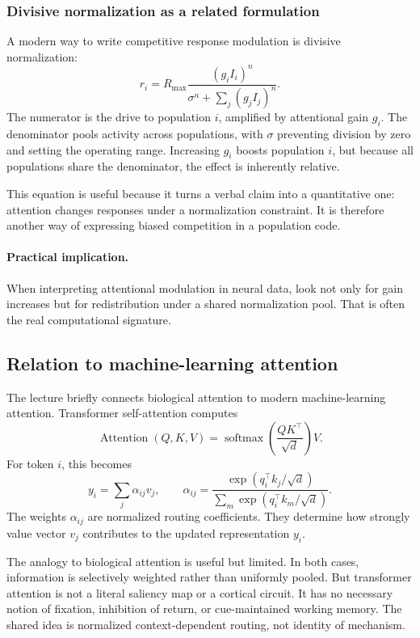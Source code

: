 \subsubsection{Divisive normalization as a related formulation}

A modern way to write competitive response modulation is divisive normalization:
\[
r_i
=
R_{\max}
\frac{(g_i I_i)^n}
{\sigma^n+\sum_j(g_j I_j)^n}.
\]
The numerator is the drive to population \(i\), amplified by attentional gain \(g_i\). The denominator pools activity across populations, with \(\sigma\) preventing division by zero and setting the operating range. Increasing \(g_i\) boosts population \(i\), but because all populations share the denominator, the effect is inherently relative.

This equation is useful because it turns a verbal claim into a quantitative one: attention changes responses under a normalization constraint. It is therefore another way of expressing biased competition in a population code.

\paragraph{Practical implication.}
When interpreting attentional modulation in neural data, look not only for gain increases but for redistribution under a shared normalization pool. That is often the real computational signature.

\subsection{Relation to machine-learning attention}

The lecture briefly connects biological attention to modern machine-learning attention. Transformer self-attention computes
\[
\operatorname{Attention}(Q,K,V)
=
\operatorname{softmax}\!\left(\frac{QK^\top}{\sqrt d}\right)V.
\]
For token \(i\), this becomes
\[
y_i
=
\sum_j \alpha_{ij}v_j,
\qquad
\alpha_{ij}
=
\frac{\exp(q_i^\top k_j/\sqrt d)}{\sum_m \exp(q_i^\top k_m/\sqrt d)}.
\]
The weights \(\alpha_{ij}\) are normalized routing coefficients. They determine how strongly value vector \(v_j\) contributes to the updated representation \(y_i\).

The analogy to biological attention is useful but limited. In both cases, information is selectively weighted rather than uniformly pooled. But transformer attention is not a literal saliency map or a cortical circuit. It has no necessary notion of fixation, inhibition of return, or cue-maintained working memory. The shared idea is normalized context-dependent routing, not identity of mechanism.

